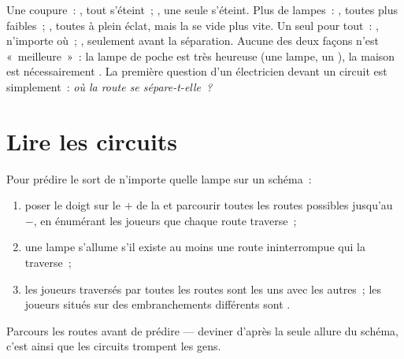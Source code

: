 \begin{remark}\label{rem:g5:series-parallel-circuits:compare}
Une coupure~: , tout s'éteint~; , une seule
 s'éteint. Plus de lampes~: , toutes plus faibles~; , toutes à plein éclat, mais la  se vide plus vite. Un
seul  pour tout~: , n'importe où~; ,
seulement avant la séparation. Aucune des deux façons n'est
«~meilleure~»~: la lampe de poche est très heureuse  (une
lampe, un ), la maison est nécessairement .
La première question d'un électricien devant un circuit est
simplement~: \emph{où la route se sépare-t-elle~?}
\end{remark}

\section{Lire les circuits}

\begin{method}\label{met:g5:series-parallel-circuits:follow}
Pour prédire le sort de n'importe quelle lampe sur un schéma~:
\begin{enumerate}
  \item poser le doigt sur le $+$ de la  et parcourir toutes les
        routes possibles jusqu'au $-$, en énumérant les joueurs que
        chaque route traverse~;
  \item une lampe s'allume s'il existe au moins une route
        ininterrompue qui la traverse~;
  \item les joueurs traversés par toutes les routes sont 
        les uns avec les autres~; les joueurs situés sur des
        embranchements différents sont .
\end{enumerate}
Parcours les routes avant de prédire --- deviner d'après la seule
allure du schéma, c'est ainsi que les circuits trompent les gens.
\end{method}

